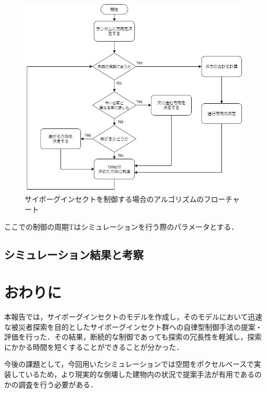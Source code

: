 \documentclass[a4paper,11pt]{jarticle}
\begin{document}
	\begin{figure}
		\centering
		\includegraphics[width=0.8\linewidth]{png/control.png}
		\caption[アルゴリズムのフローチャート]{サイボーグインセクトを制御する場合のアルゴリズムのフローチャート}
		\label{fig:control}
	\end{figure}
	ここでの制御の周期Tはシミュレーションを行う際のパラメータとする．
	\subsection{シミュレーション結果と考察}
	\section{おわりに}
	\label{sec:last}
	本報告では，サイボーグインセクトのモデルを作成し，そのモデルにおいて迅速な被災者探索を目的としたサイボーグインセクト群への自律型制御手法の提案・評価を行った．その結果，断続的な制御であっても探索の冗長性を軽減し，探索にかかる時間を短くすることができることが分かった．
	
	今後の課題として，今回用いたシミュレーションでは空間をボクセルベースで実装しているため，より現実的な倒壊した建物内の状況で提案手法が有用であるのかの調査を行う必要がある．
\end{document}
